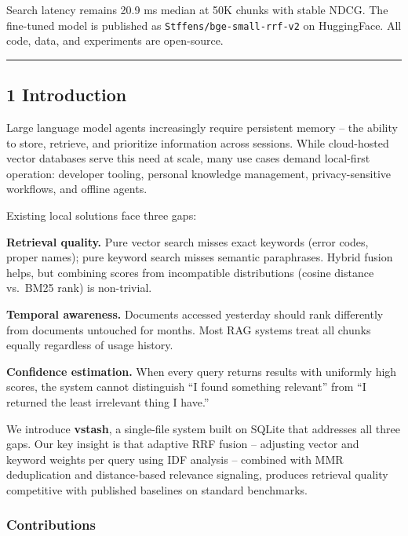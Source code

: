 \documentclass[
  11pt]{article}
\begin{document}
Search latency remains 20.9 ms median at 50K chunks with stable NDCG. The fine-tuned model is published as \texttt{Stffens/bge-small-rrf-v2} on HuggingFace. All code, data, and experiments are open-source.

\begin{center}\rule{0.5\linewidth}{0.5pt}\end{center}

\subsection{1 Introduction}\label{introduction}

Large language model agents increasingly require persistent memory -- the ability to store, retrieve, and prioritize information across sessions. While cloud-hosted vector databases serve this need at scale, many use cases demand local-first operation: developer tooling, personal knowledge management, privacy-sensitive workflows, and offline agents.

Existing local solutions face three gaps:

\textbf{Retrieval quality.} Pure vector search misses exact keywords (error codes, proper names); pure keyword search misses semantic paraphrases. Hybrid fusion helps, but combining scores from incompatible distributions (cosine distance vs.~BM25 rank) is non-trivial.

\textbf{Temporal awareness.} Documents accessed yesterday should rank differently from documents untouched for months. Most RAG systems treat all chunks equally regardless of usage history.

\textbf{Confidence estimation.} When every query returns results with uniformly high scores, the system cannot distinguish ``I found something relevant'' from ``I returned the least irrelevant thing I have.''

We introduce \textbf{vstash}, a single-file system built on SQLite that addresses all three gaps. Our key insight is that adaptive RRF fusion -- adjusting vector and keyword weights per query using IDF analysis -- combined with MMR deduplication and distance-based relevance signaling, produces retrieval quality competitive with published baselines on standard benchmarks.

\subsubsection{Contributions}\label{contributions}
\end{document}
